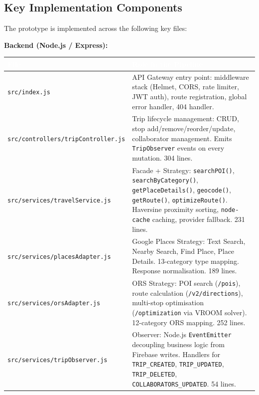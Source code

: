 \documentclass[12pt, a4paper]{article}
\newcommand{\thcell}[1]{\textcolor{white}{\textbf{\small #1}}}
\newcommand{\code}[1]{\texttt{\small #1}}
\begin{document}
\subsection{Key Implementation Components}

The prototype is implemented across the following key files:

\vspace{0.4em}
\textbf{Backend (Node.js / Express):}
\begin{longtable}{L{4.5cm} L{9.0cm}}
\toprule
{}
\thcell{File} & \thcell{Role in the Pipeline} \\
\midrule
\endhead
\bottomrule
\endfoot

\code{src/index.js} & API Gateway entry point: middleware stack (Helmet, CORS, rate limiter, JWT auth), route registration, global error handler, 404 handler. \\

\code{src/controllers/tripController.js} & Trip lifecycle management: CRUD, stop add/remove/reorder/update, collaborator management. Emits \code{TripObserver} events on every mutation. 304 lines. \\

\code{src/services/travelService.js} & Facade + Strategy: \code{searchPOI()}, \code{searchByCategory()}, \code{getPlaceDetails()}, \code{geocode()}, \code{getRoute()}, \code{optimizeRoute()}. Haversine proximity sorting, \code{node-cache} caching, provider fallback. 231 lines. \\

\code{src/services/placesAdapter.js} & Google Places Strategy: Text Search, Nearby Search, Find Place, Place Details. 13-category type mapping. Response normalisation. 189 lines. \\

\code{src/services/orsAdapter.js} & ORS Strategy: POI search (\code{/pois}), route calculation (\code{/v2/directions}), multi-stop optimisation (\code{/optimization} via VROOM solver). 12-category ORS mapping. 252 lines. \\

\code{src/services/tripObserver.js} & Observer: Node.js \code{EventEmitter} decoupling business logic from Firebase writes. Handlers for \code{TRIP\_CREATED}, \code{TRIP\_UPDATED}, \code{TRIP\_DELETED}, \code{COLLABORATORS\_UPDATED}. 54 lines. \\


\end{longtable}
\end{document}
